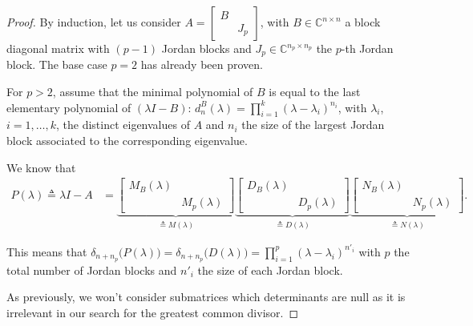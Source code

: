 \documentclass[11pt]{article}
\newcommand{\complex}{\mathbb{C}} %
\begin{document}
\begin{proof}
By induction, let us consider $A=\left[\begin{smallmatrix}
B & \\
 & J_p
\end{smallmatrix}\right]$, with $B \in \complex^{n\times n}$ a block diagonal matrix with $(p-1)$ Jordan blocks and $J_p\in \complex^{n_p\times n_p}$ the \(p\)-th Jordan block.
The base case $p = 2$ has already been proven.

For $p > 2$, assume that the minimal polynomial of $B$ is equal to the last elementary polynomial of $(\lambda I - B)$: $d_{n}^{B}(\lambda) = \prod_{i = 1}^k (\lambda - \lambda_i)^{n_i}$, with $\lambda_i$, $i= 1, \dots, k$, the distinct eigenvalues of \(A\) and $n_i$ the size of the largest Jordan block associated to the corresponding eigenvalue.

We know that
\begin{align*}
P(\lambda)\triangleq\lambda I - A 
&= \underbrace{\begin{bmatrix}
M_{B}(\lambda) & \\
& M_{p}(\lambda)
\end{bmatrix}}_{\triangleq M(\lambda)}\underbrace{\begin{bmatrix}
D_{B}(\lambda) & \\
& D_{p}(\lambda)
\end{bmatrix}}_{\triangleq D(\lambda)}\underbrace{\begin{bmatrix}
N_{B}(\lambda) & \\
& N_{p}(\lambda)
\end{bmatrix}}_{\triangleq N(\lambda)}.
\end{align*}

This means that $\delta_{n+n_p}\big(P(\lambda)\big) = \delta_{n+n_p}\big(D(\lambda)\big) = \prod_{i = 1}^p (\lambda - \lambda_i)^{n'_i}$ with $p$ the total number of Jordan blocks and $n'_i$ the size of each Jordan block.

As previously, we won't consider submatrices which determinants are null as it is irrelevant in our search for the greatest common divisor.


\end{proof}
\end{document}
